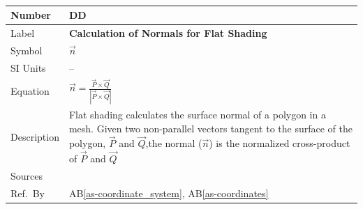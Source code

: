 \documentclass[12pt]{article}
\newcommand{\colAwidth}{0.13\textwidth}
\newcommand{\colBwidth}{0.82\textwidth}
\newcounter{defnum} %
\newcounter{datadefnum} %
\newcommand{\aBref}[1]{AB\ref{#1}}
\begin{document}
~\newline

\noindent
\begin{minipage}{\textwidth}
	\renewcommand*{\arraystretch}{1.5}
	\begin{tabular}{| p{\colAwidth} | p{\colBwidth}|}
		\hline
		\rowcolor[gray]{0.9}
		Number& DD{datadefnum}\thedatadefnum 
		\label{DD_Flat_Shading}\\
		\hline
		Label& \bf Calculation of Normals for Flat Shading\\
		\hline
		Symbol &$\vec{n}$\\
		\hline
		SI Units & --\\
		\hline
		Equation&$\vec{n} = \frac{\vec{P} \times \vec{Q}}{|\vec{P} \times 
		\vec{Q}|}$\\
		\hline
		Description & Flat shading calculates the surface normal of a polygon 
		in a mesh. Given two non-parallel vectors tangent to the surface of the 
		polygon, $\vec{P}$ and $\vec{Q}$,the normal ($\vec{n}$) is 
		the normalized cross-product of $\vec{P}$ and $\vec{Q}$ \\
		\hline
		Sources& \cite{shreiner2012}\\
		\hline
		Ref.\ By & \aBref{as-coordinate_system}, \aBref{as-coordinates} \\
		\hline
	\end{tabular}
\end{minipage}\\

~\newline
\end{document}

